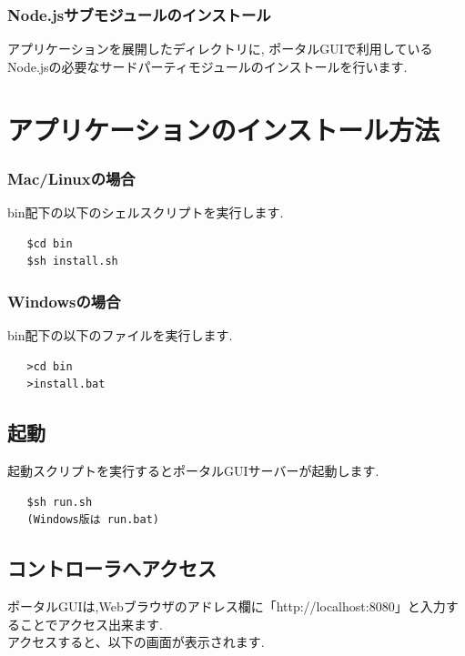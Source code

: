 \documentclass[a4paper,10pt,oneside]{jsbook}
\begin{document}
\subsection{Node.jsサブモジュールのインストール}
アプリケーションを展開したディレクトリに,
ポータルGUIで利用しているNode.jsの必要なサードパーティモジュールのインストールを行います.


\chapter{アプリケーションのインストール方法}

\subsection{Mac/Linuxの場合}
bin配下の以下のシェルスクリプトを実行します.\\

\begin{verbatim}
   $cd bin
   $sh install.sh
\end{verbatim}


\subsection{Windowsの場合}
bin配下の以下のファイルを実行します.\\
\begin{verbatim}
   >cd bin
   >install.bat
\end{verbatim}


\section{起動}
起動スクリプトを実行するとポータルGUIサーバーが起動します.
\begin{verbatim}
   $sh run.sh
   (Windows版は run.bat)
\end{verbatim}

\section{コントローラへアクセス}
ポータルGUIは,Webブラウザのアドレス欄に「http://localhost:8080」と入力することでアクセス出来ます.\\
アクセスすると、以下の画面が表示されます.\\
\end{document}
